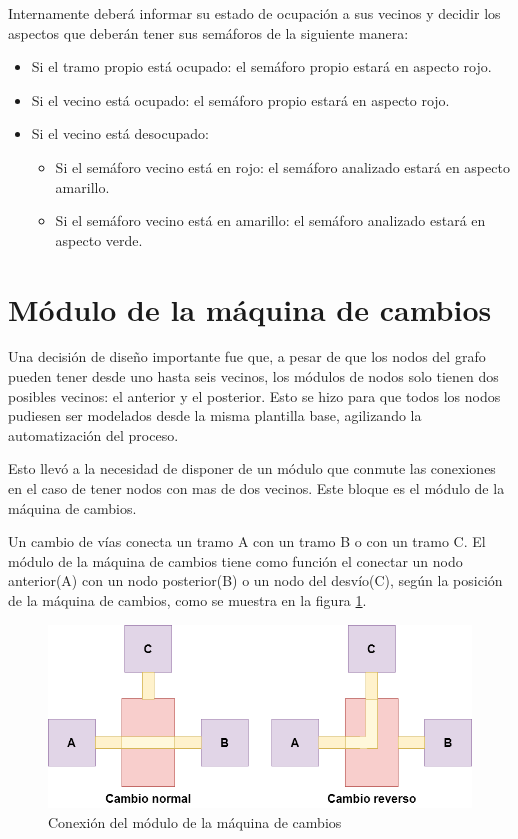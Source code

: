 	Internamente deberá informar su estado de ocupación a sus vecinos y decidir los aspectos que deberán tener sus semáforos de la siguiente manera:
			
	\begin{itemize}
		\item Si el tramo propio está ocupado: el semáforo propio estará en aspecto rojo.
		\item Si el vecino está ocupado: el semáforo propio estará en aspecto rojo.
		\item Si el vecino está desocupado:
		\begin{itemize}
			\item Si el semáforo vecino está en rojo: el semáforo analizado estará en aspecto amarillo.
			\item Si el semáforo vecino está en amarillo:  el semáforo analizado estará en aspecto verde.
		\end{itemize}				 
	\end{itemize}
	
\section{Módulo de la máquina de cambios}

	Una decisión de diseño importante fue que, a pesar de que los nodos del grafo pueden tener desde uno hasta seis vecinos, los módulos de nodos solo tienen dos posibles vecinos: el anterior y el posterior. Esto se hizo para que todos los nodos pudiesen ser modelados desde la misma plantilla base, agilizando la automatización del proceso.
	
	Esto llevó a la necesidad de disponer de un módulo que conmute las conexiones en el caso de tener nodos con mas de dos vecinos. Este bloque es el módulo de la máquina de cambios.
	
	Un cambio de vías conecta un tramo A con un tramo B o con un tramo C. El módulo de la máquina de cambios tiene como función el conectar un nodo anterior(A) con un nodo posterior(B) o un nodo del desvío(C), según la posición de la máquina de cambios, como se muestra en la figura \ref{fig:Cambio_conexion}.
	
	\begin{figure}[h]
	\centering
	\includegraphics[scale=.5]{./Figures/FSMD-Conexiones}
		\caption{Conexión del módulo de la máquina de cambios}
		\label{fig:Cambio_conexion}
	\end{figure}	
	

